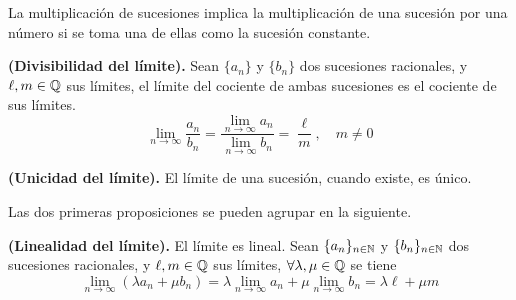 {\begin{remark}
    La multiplicación de sucesiones implica la multiplicación de una sucesión por una número si se toma una de ellas como la sucesión constante.
\end{remark}

\begin{prop}
    \textbf{(Divisibilidad del límite).} Sean $\{a_n\} $ y $\{b_n\} $ dos sucesiones racionales, y $\ell, m\in\mathbb{Q}$ sus límites, el límite del cociente de ambas sucesiones es el cociente de sus límites.
    \begin{equation}
        \lim_{n\to\infty} \frac{a_n}{b_n} = \frac{\lim_{n\to\infty} a_n}{\lim_{n\to\infty}b_n} = \frac{\ell}{m},\quad m\neq 0
    \end{equation}
\end{prop}

\begin{prop}
    \textbf{(Unicidad del límite).} El límite de una sucesión, cuando existe, es único.
\end{prop}

Las dos primeras proposiciones se pueden agrupar en la siguiente.

\begin{prop}
    \textbf{(Linealidad del límite).} El límite es lineal. Sean $\{a_n\}_{n\in\mathbb{N}} $ y $\{b_n\}_{n\in\mathbb{N}} $ dos sucesiones racionales, y $\ell, m\in\mathbb{Q}$ sus límites, $\forall\lambda, \mu\in\mathbb{Q}$ se tiene
    \begin{equation}
        \lim_{n\to\infty}\left( \lambda a_n + \mu b_n \right) = \lambda \lim_{n\to\infty}a_n + \mu\lim_{n\to\infty}b_n = \lambda\ell + \mu m
    \end{equation}
\end{prop}


}
